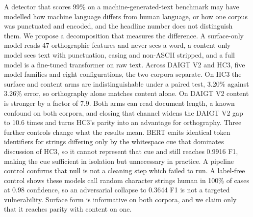A detector that scores 99\% on a machine-generated-text benchmark may have modelled how machine language differs from human language, or how one corpus was punctuated and encoded, and the headline number does not distinguish them. We propose a decomposition that measures the difference. A surface-only model reads 47 orthographic features and never sees a word, a content-only model sees text with punctuation, casing and non-ASCII stripped, and a full model is a fine-tuned transformer on raw text. Across DAIGT V2 and HC3, five model families and eight configurations, the two corpora separate. On HC3 the surface and content arms are indistinguishable under a paired test, 3.20\% against 3.26\% error, so orthography alone matches content alone. On DAIGT V2 content is stronger by a factor of 7.9. Both arms can read document length, a known confound on both corpora, and closing that channel widens the DAIGT V2 gap to 10.6 times and turns HC3's parity into an advantage for orthography. Three further controls change what the results mean. BERT emits identical token identifiers for strings differing only by the whitespace cue that dominates discussion of HC3, so it cannot represent that cue and still reaches 0.9916 F1, making the cue sufficient in isolation but unnecessary in practice. A pipeline control confirms that null is not a cleaning step which failed to run. A label-free control shows these models call random character strings human in 100\% of cases at 0.98 confidence, so an adversarial collapse to 0.3644 F1 is not a targeted vulnerability. Surface form is informative on both corpora, and we claim only that it reaches parity with content on one.
